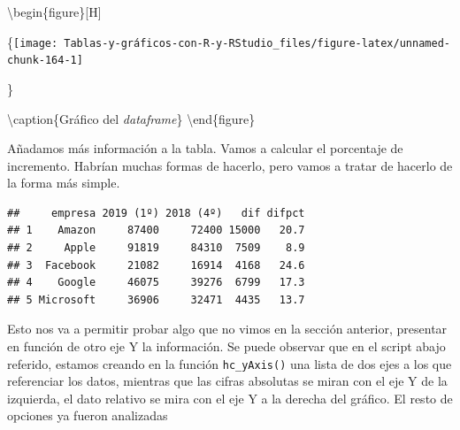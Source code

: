 \documentclass[
]{book}
\newenvironment{Shaded}{\begin{snugshade}}{\end{snugshade}}
\newcommand{\CommentTok}[1]{\textcolor[rgb]{0.56,0.35,0.01}{\textit{#1}}}
\newcommand{\DecValTok}[1]{\textcolor[rgb]{0.00,0.00,0.81}{#1}}
\newcommand{\FunctionTok}[1]{\textcolor[rgb]{0.00,0.00,0.00}{#1}}
\newcommand{\NormalTok}[1]{#1}
\newcommand{\OtherTok}[1]{\textcolor[rgb]{0.56,0.35,0.01}{#1}}
\newcommand{\SpecialCharTok}[1]{\textcolor[rgb]{0.00,0.00,0.00}{#1}}
\begin{document}
\textbackslash begin\{figure\}{[}H{]}

\{\centering \texttt{[image: Tablas-y-gráficos-con-R-y-RStudio\_files/figure-latex/unnamed-chunk-164-1]}

\}

\textbackslash caption\{Gráfico del \emph{dataframe}\}\label{fig:unnamed-chunk-164}
\textbackslash end\{figure\}

Añadamos más información a la tabla. Vamos a calcular el porcentaje de incremento. Habrían muchas formas de hacerlo, pero vamos a tratar de hacerlo de la forma más simple.

\begin{Shaded}
\end{Shaded}

\begin{verbatim}
##     empresa 2019 (1º) 2018 (4º)   dif difpct
## 1    Amazon     87400     72400 15000   20.7
## 2     Apple     91819     84310  7509    8.9
## 3  Facebook     21082     16914  4168   24.6
## 4    Google     46075     39276  6799   17.3
## 5 Microsoft     36906     32471  4435   13.7
\end{verbatim}

Esto nos va a permitir probar algo que no vimos en la sección anterior, presentar en función de otro eje Y la información. Se puede observar que en el script abajo referido, estamos creando en la función \texttt{hc\_yAxis()} una lista de dos ejes a los que referenciar los datos, mientras que las cifras absolutas se miran con el eje Y de la izquierda, el dato relativo se mira con el eje Y a la derecha del gráfico. El resto de opciones ya fueron analizadas
\end{document}
